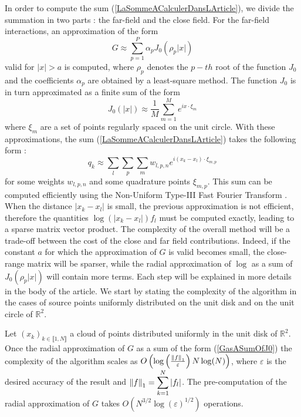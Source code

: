 \documentclass[11pt,a4paper]{article}
\begin{document}
In order to compute the sum (\ref{LaSommeACalculerDansLArticle}), we divide the summation in two parts : the far-field and the close field. For the far-field interactions, an approximation of the form 
\begin{equation}
G \approx \sum_{p=1}^P \alpha_p J_0(\rho_p |x|)
\label{GasASumOfJ0}
\end{equation}
valid for $|x|>a$ is computed, where $\rho_p$ denotes the $p-th$ root of the function $J_0$ and the coefficients $\alpha_p$ are obtained by a least-square method. The function $J_0$ is in turn approximated as a finite sum of the form \[J_0(|x|) \approx \frac{1}{M}\sum_{m=1}^M e^{i x \cdot \xi_m}\] 
where $\xi_m$ are a set of points regularly spaced on the unit circle. 
With these approximations, the sum (\ref{LaSommeACalculerDansLArticle}) takes the following form : 
\[ q_k \approx \sum_{l}\sum_{p}\sum_{m} w_{l,p,n} e^{i (x_k - x_l) \cdot \xi_{m,p}}\]
for some weights $w_{l,p,n}$ and some quadrature points $\xi_{m,p}$. This sum can be computed efficiently using the Non-Uniform Type-III Fast Fourier Transform \cite{NuFFT}. 
When the distance $|x_k-x_l|$ is small, the previous approximation is not efficient, therefore the quantities $\log(|x_k-x_l|)f_l$ must be computed exactly, leading to a sparse matrix vector product. The complexity of the overall method will be a trade-off between the cost of the close and far field contributions. Indeed, if the constant $a$ for which the approximation of $G$ is valid becomes small, the close-range matrix will be sparser, while the radial approximation of $\log$ as a sum of $J_0(\rho_p|x|)$ will contain more terms. Each step will be explained in more details in the body of the article. We start by stating the complexity of the algorithm in the cases of source points uniformly distributed on the unit disk  and on the unit circle of $\mathbb{R}^2$. 

\begin{Prop*} Let $(x_k)_{k\in \llbracket 1,N\rrbracket}$ a cloud of points distributed uniformly in the unit disk of $\mathbb{R}^2$. Once the radial approximation of $G$ as a sum of the form (\ref{GasASumOfJ0}) the complexity of the algorithm scales as $O\left(\log\left(\frac{\left\|f\right\|_1}{\varepsilon}\right) N \log(N)\right)$, where $\varepsilon$ is the desired accuracy of the result and $\left\|f\right\|_1 = \displaystyle\sum_{k=1}^N |f_l|$. The pre-computation of the radial approximation of $G$ takes $O(N^{3/2}\log(\varepsilon)^{1/2})$ operations.  
\end{Prop*}
\end{document}

